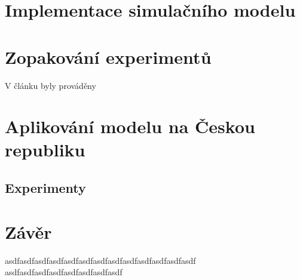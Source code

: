 \documentclass[a4paper,11pt]{article}
\begin{document}
	\section{Implementace simulačního modelu}
	\section{Zopakování experimentů}
		V článku byly prováděny
	\section{Aplikování modelu na Českou republiku}
	\subsection{Experimenty}
			
	\section{Závěr}
		asdfasdfasdfasdfasdfasdfasdfasdfasdfasdfasdfasdfasdf
		asdfasdfasdfasdfasdfasdfasdfasdf

	\newpage
	
	\renewcommand{\refname}{Literatura}
	
\end{document}
